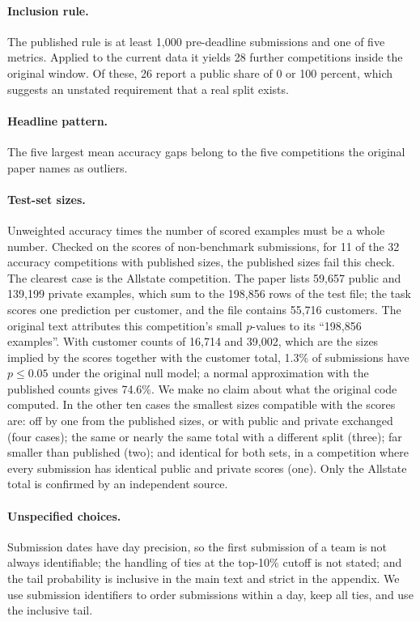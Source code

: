 \documentclass[10pt]{article}
\begin{document}
\paragraph{Inclusion rule.} The published rule is at least 1,000 pre-deadline submissions and one of five metrics. Applied to the current data it yields 28 further competitions inside the original window. Of these, 26 report a public share of 0 or 100 percent, which suggests an unstated requirement that a real split exists.

\paragraph{Headline pattern.} The five largest mean accuracy gaps belong to the five competitions the original paper names as outliers.

\paragraph{Test-set sizes.} Unweighted accuracy times the number of scored examples must be a whole number. Checked on the scores of non-benchmark submissions, for 11 of the 32 accuracy competitions with published sizes, the published sizes fail this check. The clearest case is the Allstate competition. The paper lists 59,657 public and 139,199 private examples, which sum to the 198,856 rows of the test file; the task scores one prediction per customer, and the file contains 55,716 customers. The original text attributes this competition's small $p$-values to its ``198,856 examples''. With customer counts of 16,714 and 39,002, which are the sizes implied by the scores together with the customer total, 1.3\% of submissions have $p \le 0.05$ under the original null model; a normal approximation with the published counts gives 74.6\%. We make no claim about what the original code computed. In the other ten cases the smallest sizes compatible with the scores are: off by one from the published sizes, or with public and private exchanged (four cases); the same or nearly the same total with a different split (three); far smaller than published (two); and identical for both sets, in a competition where every submission has identical public and private scores (one). Only the Allstate total is confirmed by an independent source.

\paragraph{Unspecified choices.} Submission dates have day precision, so the first submission of a team is not always identifiable; the handling of ties at the top-10\% cutoff is not stated; and the tail probability is inclusive in the main text and strict in the appendix. We use submission identifiers to order submissions within a day, keep all ties, and use the inclusive tail.
\end{document}
